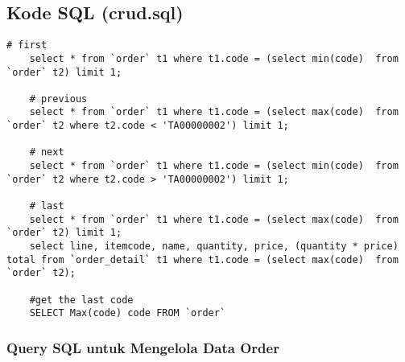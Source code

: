 \subsection{Kode SQL (crud.sql)}

\begin{lstlisting}[style=sql]
	# first
	select * from `order` t1 where t1.code = (select min(code)  from `order` t2) limit 1;
	
	# previous
	select * from `order` t1 where t1.code = (select max(code)  from `order` t2 where t2.code < 'TA00000002') limit 1;
	
	# next
	select * from `order` t1 where t1.code = (select min(code)  from `order` t2 where t2.code > 'TA00000002') limit 1;
	
	# last
	select * from `order` t1 where t1.code = (select max(code)  from `order` t2) limit 1;
	select line, itemcode, name, quantity, price, (quantity * price) total from `order_detail` t1 where t1.code = (select max(code)  from `order` t2);
	
	#get the last code
	SELECT Max(code) code FROM `order`
\end{lstlisting}

\subsubsection{Query SQL untuk Mengelola Data Order}

